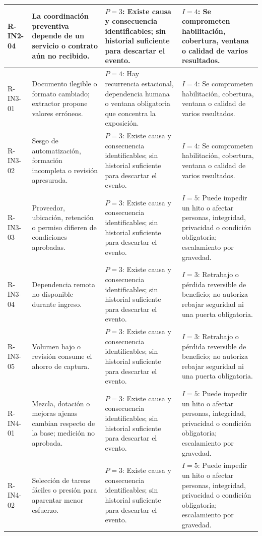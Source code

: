 \begin{longtable}{L{.10\textwidth}L{.27\textwidth}L{.27\textwidth}L{.27\textwidth}}
R-IN2-04 & La coordinación preventiva depende de un servicio o contrato aún no recibido. & $P=3$: Existe causa y consecuencia identificables; sin historial suficiente para descartar el evento. & $I=4$: Se comprometen habilitación, cobertura, ventana o calidad de varios resultados.\\\hline
R-IN3-01 & Documento ilegible o formato cambiado; extractor propone valores erróneos. & $P=4$: Hay recurrencia estacional, dependencia humana o ventana obligatoria que concentra la exposición. & $I=4$: Se comprometen habilitación, cobertura, ventana o calidad de varios resultados.\\\hline
R-IN3-02 & Sesgo de automatización, formación incompleta o revisión apresurada. & $P=3$: Existe causa y consecuencia identificables; sin historial suficiente para descartar el evento. & $I=4$: Se comprometen habilitación, cobertura, ventana o calidad de varios resultados.\\\hline
R-IN3-03 & Proveedor, ubicación, retención o permiso difieren de condiciones aprobadas. & $P=3$: Existe causa y consecuencia identificables; sin historial suficiente para descartar el evento. & $I=5$: Puede impedir un hito o afectar personas, integridad, privacidad o condición obligatoria; escalamiento por gravedad.\\\hline
R-IN3-04 & Dependencia remota no disponible durante ingreso. & $P=3$: Existe causa y consecuencia identificables; sin historial suficiente para descartar el evento. & $I=3$: Retrabajo o pérdida reversible de beneficio; no autoriza rebajar seguridad ni una puerta obligatoria.\\\hline
R-IN3-05 & Volumen bajo o revisión consume el ahorro de captura. & $P=3$: Existe causa y consecuencia identificables; sin historial suficiente para descartar el evento. & $I=3$: Retrabajo o pérdida reversible de beneficio; no autoriza rebajar seguridad ni una puerta obligatoria.\\\hline
R-IN4-01 & Mezcla, dotación o mejoras ajenas cambian respecto de la base; medición no aprobada. & $P=3$: Existe causa y consecuencia identificables; sin historial suficiente para descartar el evento. & $I=5$: Puede impedir un hito o afectar personas, integridad, privacidad o condición obligatoria; escalamiento por gravedad.\\\hline
R-IN4-02 & Selección de tareas fáciles o presión para aparentar menor esfuerzo. & $P=3$: Existe causa y consecuencia identificables; sin historial suficiente para descartar el evento. & $I=5$: Puede impedir un hito o afectar personas, integridad, privacidad o condición obligatoria; escalamiento por gravedad.\\\hline

\end{longtable}
